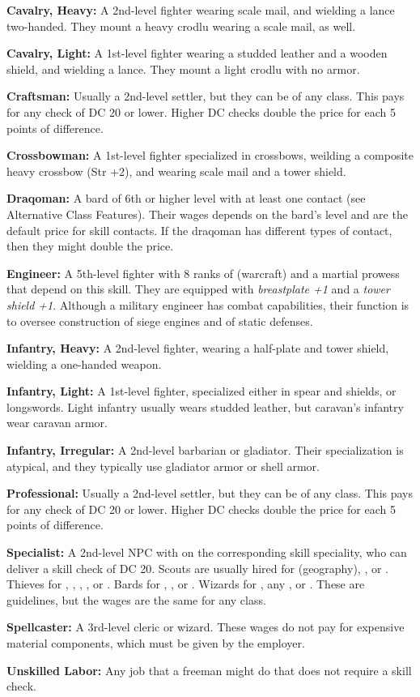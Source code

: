 \textbf{Cavalry, Heavy:} A 2nd-level fighter wearing scale mail, and wielding a lance two-handed. They mount a heavy crodlu wearing a scale mail, as well.

\textbf{Cavalry, Light:} A 1st-level fighter wearing a studded leather and a wooden shield, and wielding a lance. They mount a light crodlu with no armor.

\textbf{Craftsman:} Usually a 2nd-level settler, but they can be of any class. This pays for any  check of DC 20 or lower. Higher DC checks double the price for each 5 points of difference. 

\textbf{Crossbowman:} A 1st-level fighter specialized in crossbows, weilding a composite heavy crossbow (Str +2), and wearing scale mail and a tower shield.

\textbf{Draqoman:} A bard of 6th or higher level with at least one contact (see Alternative Class Features). Their wages depends on the bard's level and are the default price for skill contacts. If the draqoman has different types of contact, then they might double the price.

\textbf{Engineer:} A 5th-level fighter with 8 ranks of  (warcraft) and a martial prowess that depend on this skill. They are equipped with \emph{breastplate +1} and a \emph{tower shield +1}. Although a military engineer has combat capabilities, their function is to oversee construction of siege engines and of static defenses.

\textbf{Infantry, Heavy:} A 2nd-level fighter, wearing a half-plate and tower shield, wielding a one-handed weapon. 

\textbf{Infantry, Light:} A 1st-level fighter, specialized either in spear and shields, or longswords. Light infantry usually wears studded leather, but caravan's infantry wear caravan armor.

\textbf{Infantry, Irregular:} A 2nd-level barbarian or gladiator. Their specialization is atypical, and they typically use gladiator armor or shell armor.

\textbf{Professional:} Usually a 2nd-level settler, but they can be of any class. This pays for any  check of DC 20 or lower. Higher DC checks double the price for each 5 points of difference.

\textbf{Specialist:} A 2nd-level NPC with  on the corresponding skill speciality, who can deliver a skill check of DC 20. Scouts are usually hired for  (geography), , or . Thieves for , , , , or . Bards for , , or . Wizards for , any , or . These are guidelines, but the wages are the same for any class.

\textbf{Spellcaster:} A 3rd-level cleric or wizard. These wages do not pay for expensive material components, which must be given by the employer.

\textbf{Unskilled Labor:} Any job that a freeman might do that does not require a skill check.